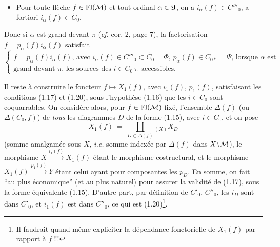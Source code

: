 \begin{itemize}[leftmargin=5em, labelwidth=4em, labelsep=1em, align=left]
\item[(1.21)] \qquad Pour toute flèche $f \in \mathrm{Fl}(\mathcal{M})$ et tout ordinal $\alpha \in \mathfrak{U}$, on a $i_\alpha(f) \in C'''_0$, a fortiori $i_\alpha(f) \in \widetilde{C_0}$.
\end{itemize}

Donc si $\alpha$ est grand devant $\pi$ (\textit{cf.} cor. 2, page 7), la factorisation $f = p_\alpha(f)i_\alpha(f)$ satisfait
\[
\left\{
\begin{array}{l}
f = p_\alpha(f)i_\alpha(f)\text{, avec } i_\alpha(f) \in C'''_0 \subset \widetilde{C_0} = \Phi \text{, } p_\alpha(f) \in C_{0*} = \Psi \text{, lorsque } \alpha \text{ est}\\
\text{grand devant } \pi\text{, les sources des } i \in C_0 \ \pi\text{-accessibles.}
\end{array}
\right.
\tag*{(1.22)}
\]

Il reste à construire le foncteur $f \longmapsto X_1(f)$, avec $i_1(f)$, $p_1(f)$, satisfaisant les conditions (1.17) et (1.20), sous l'hypothèse (1.16) que les $i \in C_0$ sont coquarrables. On considère alors, pour $f \in \mathrm{Fl}(\mathcal{M})$ fixé, l'ensemble $\Delta(f)$ (ou $\Delta(C_0, f)$) de \textit{tous} les diagrammes $D$ de la forme (1.15), avec $i \in C_0$, et on pose
\[
X_1(f) \ = \ \coprod_{D \in \Delta(f)}{}_{(X)} X_D
\tag*{(1.23)}
\]
(somme amalgamée sous $X$, \textit{i.e.} somme indexée
par $\Delta(f)$ dans $X\backslash\mathcal{M}$), le morphisme $X \xrightarrow{i_1(f)} X_1(f)$ étant le morphisme costructural, et le morphisme $X_1(f) \xrightarrow{p_1(f)} Y$ étant celui ayant pour composantes les $p_D$. En somme, on fait “au plus économique” (et au plus naturel) pour assurer la validité de (1.17), sous la forme équivalente (1.15). D'autre part, par définition de $C'_0$, $C''_0$, les $i_D$ sont dans $C'_0$, et $i_1(f)$ est dans $C''_0$, ce qui est (1.20)\footnote{Il faudrait quand même expliciter la dépendance fonctorielle de $X_1(f)$ par rapport à $f$\,!!!}.

